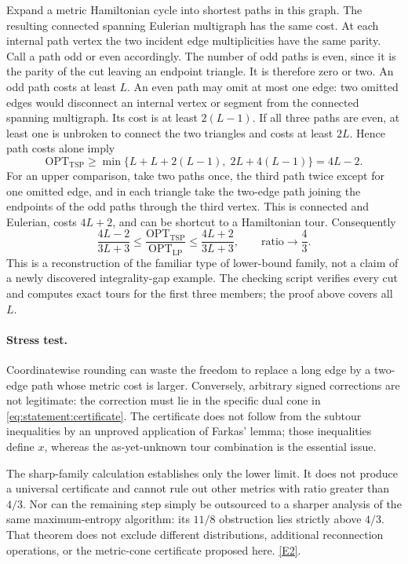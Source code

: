 \documentclass[11pt,a4paper]{article}
\newcommand{\eref}[2]{\hyperlink{extra:#1:#2}{[E#2]}}
\numberwithin{equation}{section}
\begin{document}
Expand a metric Hamiltonian cycle into shortest paths in this graph.
The resulting connected spanning Eulerian multigraph has the same
cost. At each internal path vertex the two incident edge multiplicities
have the same parity. Call a path odd or even accordingly.
The number of odd paths is even, since it is the parity of the cut
leaving an endpoint triangle. It is therefore zero or two.
An odd path costs at least $L$. An even path may omit at most one
edge: two omitted edges would disconnect an internal vertex or segment
from the connected spanning multigraph. Its cost is at least
$2(L-1)$. If all three paths are even, at least one is unbroken to
connect the two triangles and costs at least $2L$. Hence path costs
alone imply
\[
 \mathrm{OPT}_{\mathrm{TSP}}\ge
 \min\{L+L+2(L-1),\;2L+4(L-1)\}=4L-2.
\]
For an upper comparison, take two paths once, the third path twice
except for one omitted edge, and in each triangle take the two-edge
path joining the endpoints of the odd paths through the third vertex.
This is connected and Eulerian, costs $4L+2$, and can be shortcut to
a Hamiltonian tour. Consequently
\begin{equation}\label{eq:statement:limit}
 \frac{4L-2}{3L+3}\le
 \frac{\mathrm{OPT}_{\mathrm{TSP}}}{\mathrm{OPT}_{\mathrm{LP}}}
 \le\frac{4L+2}{3L+3},\qquad
                         \text{ratio}\longrightarrow\frac43.
\end{equation}
This is a reconstruction of the familiar type of lower-bound family,
not a claim of a newly discovered integrality-gap example. The checking
script verifies every cut and computes exact tours for the first three
members; the proof above covers all $L$.

\paragraph{Stress test.}
Coordinatewise rounding can waste the freedom to replace a long edge
by a two-edge path whose metric cost is larger. Conversely, arbitrary
signed corrections are not legitimate: the correction must lie in the
specific dual cone in \eqref{eq:statement:certificate}. The certificate does
not follow from the subtour inequalities by an unproved application of
Farkas' lemma; those inequalities define $x$, whereas the as-yet-unknown
tour combination is the essential issue.

The sharp-family calculation establishes only the lower limit. It does
not produce a universal certificate and cannot rule out other metrics
with ratio greater than $4/3$. Nor can the remaining step simply be
outsourced to a sharper analysis of the same maximum-entropy algorithm:
its $11/8$ obstruction lies strictly above $4/3$. That theorem does not
exclude different distributions, additional reconnection operations,
or the metric-cone certificate proposed here. \eref{statement}{2}.
\end{document}
